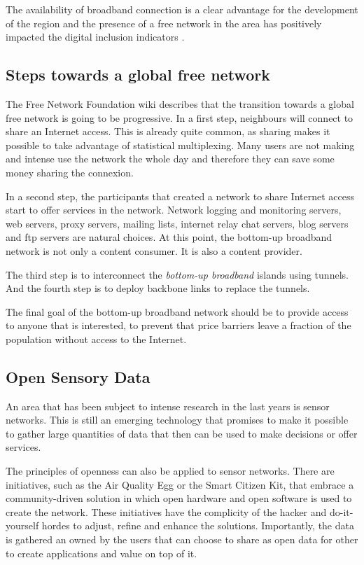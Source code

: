 \documentclass[journal]{IEEEtran}
\begin{document}
The availability of broadband connection is a clear advantage for the development of the region and the presence of a free network in the area has positively impacted the digital inclusion indicators \cite{oliver2010wca}.

\subsection{Steps towards a global free network}
The Free Network Foundation wiki describes that the transition towards a global free network is going to be progressive.
In a first step, neighbours will connect to share an Internet access.
This is already quite common, as sharing makes it possible to take advantage of statistical multiplexing.
Many users are not making and intense use the network the whole day and therefore they can save some money sharing the connexion.

In a second step, the participants that created a network to share Internet access start to offer services in the network.
Network logging and monitoring servers, web servers, proxy servers, mailing lists, internet relay chat servers, blog servers and ftp servers are natural choices.
At this point, the bottom-up broadband network is not only a content consumer.
It is also a content provider.

The third step is to interconnect the \emph{bottom-up broadband} islands using tunnels.
And the fourth step is to deploy backbone links to replace the tunnels.

The final goal of the bottom-up broadband network should be to provide access to anyone that is interested, to prevent that price barriers leave a fraction of the population without access to the Internet.


\subsection{Open Sensory Data}

An area that has been subject to intense research in the last years is sensor networks.
This is still an emerging technology that promises to make it possible to gather large quantities of data that then can be used to make decisions or offer services.

The principles of openness can also be applied to sensor networks.
There are initiatives, such as the Air Quality Egg or the Smart Citizen Kit, that embrace a community-driven solution in which open hardware and open software is used to create the network.
These initiatives have the complicity of the hacker and do-it-yourself hordes to adjust, refine and enhance the solutions.
Importantly, the data is gathered an owned by the users that can choose to share as open data for other to create applications and value on top of it.
\end{document}
